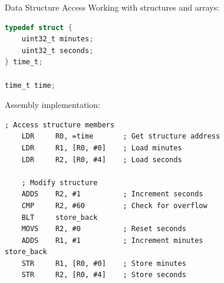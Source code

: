 \begin{example2}{Data Structure Access}
Working with structures and arrays:
\begin{lstlisting}[language=C, style=basesmol]
typedef struct {
    uint32_t minutes;
    uint32_t seconds;
} time_t;

time_t time;
\end{lstlisting}

Assembly implementation:
\begin{lstlisting}[language=armasm, style=basesmol]
    ; Access structure members
    LDR     R0, =time       ; Get structure address
    LDR     R1, [R0, #0]    ; Load minutes
    LDR     R2, [R0, #4]    ; Load seconds
    
    ; Modify structure
    ADDS    R2, #1          ; Increment seconds
    CMP     R2, #60         ; Check for overflow
    BLT     store_back
    MOVS    R2, #0          ; Reset seconds
    ADDS    R1, #1          ; Increment minutes
store_back
    STR     R1, [R0, #0]    ; Store minutes
    STR     R2, [R0, #4]    ; Store seconds
\end{lstlisting}
\end{example2}





